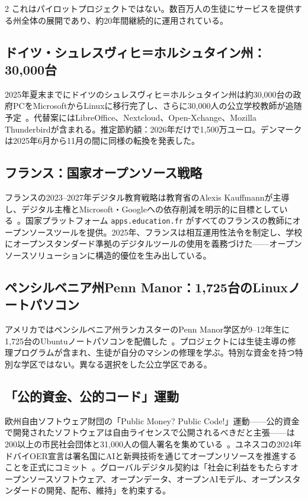 \documentclass[11pt, a4paper]{article}
\begin{document}
\begin{multicols}{2}
これはパイロットプロジェクトではない。数百万人の生徒にサービスを提供する州全体の展開であり、約20年間継続的に運用されている。

\subsection{ドイツ・シュレスヴィヒ＝ホルシュタイン州：30,000台}

2025年夏末までにドイツのシュレスヴィヒ＝ホルシュタイン州は約30,000台の政府PCをMicrosoftからLinuxに移行完了し、さらに30,000人の公立学校教師が追随予定~\citep{schleswig2025linux}。代替案にはLibreOffice、Nextcloud、Open-Xchange、Mozilla Thunderbirdが含まれる。推定節約額：2026年だけで1,500万ユーロ。デンマークは2025年6月から11月の間に同様の転換を発表した。

\subsection{フランス：国家オープンソース戦略}

フランスの2023--2027年デジタル教育戦略は教育省のAlexis Kauffmannが主導し、デジタル主権とMicrosoft・Googleへの依存削減を明示的に目標としている~\citep{france2023digital}。国家プラットフォーム \texttt{apps.education.fr} がすべてのフランスの教師にオープンソースツールを提供。2025年、フランスは相互運用性法令を制定し、学校にオープンスタンダード準拠のデジタルツールの使用を義務づけた——オープンソースソリューションに構造的優位を生み出している。

\subsection{ペンシルベニア州Penn Manor：1,725台のLinuxノートパソコン}

アメリカではペンシルベニア州ランカスターのPenn Manor学区が9--12年生に1,725台のUbuntuノートパソコンを配備した~\citep{pennmanor2024linux}。プロジェクトには生徒主導の修理プログラムが含まれ、生徒が自分のマシンの修理を学ぶ。特別な資金を持つ特別な学区ではない。異なる選択をした公立学区である。

\subsection{「公的資金、公的コード」運動}

欧州自由ソフトウェア財団の「Public Money? Public Code!」運動——公的資金で開発されたソフトウェアは自由ライセンスで公開されるべきだと主張——は200以上の市民社会団体と31,000人の個人署名を集めている~\citep{fsfe2024publiccode}。ユネスコの2024年ドバイOER宣言は署名国にAIと新興技術を通じてオープンリソースを推進することを正式にコミット~\citep{unesco2024oer}。グローバルデジタル契約は「社会に利益をもたらすオープンソースソフトウェア、オープンデータ、オープンAIモデル、オープンスタンダードの開発、配布、維持」を約束する。


\end{multicols}
\end{document}
